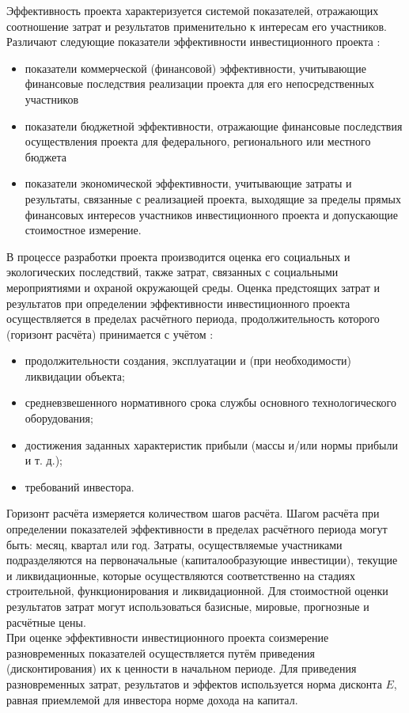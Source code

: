 \documentclass[a4paper,12pt]{article}
\begin{document}
Эффективность проекта характеризуется системой показателей, отражающих соотношение затрат и результатов применительно к интересам
его участников.
Различают следующие показатели эффективности инвестиционного
проекта :
\begin{itemize}
\item показатели коммерческой (финансовой) эффективности, учитывающие финансовые последствия реализации проекта для его непосредственных участников
\item показатели бюджетной эффективности, отражающие финансовые последствия осуществления проекта для федерального, регионального или местного бюджета
\item показатели экономической эффективности, учитывающие затраты и
результаты, связанные с реализацией проекта, выходящие за пределы
прямых финансовых интересов участников инвестиционного проекта и
допускающие стоимостное измерение.\\
\end{itemize}
В процессе разработки проекта производится оценка его социальных
и экологических последствий, также затрат, связанных с социальными мероприятиями и охраной окружающей среды.
Оценка предстоящих затрат и результатов при определении эффективности инвестиционного проекта осуществляется в пределах расчётного периода, продолжительность которого (горизонт расчёта) принимается с учётом :
\begin{itemize}
	\item продолжительности создания, эксплуатации и (при необходимости) ликвидации объекта;
	\item средневзвешенного нормативного срока службы основного технологического оборудования;
	\item достижения заданных характеристик прибыли (массы и/или нормы прибыли и т. д.);
\item требований инвестора. \\
\end{itemize}
Горизонт расчёта измеряется количеством шагов расчёта. Шагом расчёта при определении показателей эффективности в пределах расчётного периода могут быть: месяц, квартал или год.
Затраты, осуществляемые участниками подразделяются на первоначальные (капиталообразующие инвестиции), текущие и ликвидационные,
которые осуществляются соответственно на стадиях строительной, функционирования и ликвидационной. Для стоимостной оценки результатов затрат могут использоваться базисные, мировые, прогнозные и расчётные цены.\\
При оценке эффективности инвестиционного проекта соизмерение
разновременных показателей осуществляется путём приведения (дисконтирования) их к ценности в начальном периоде. Для приведения разновременных затрат, результатов и эффектов используется норма дисконта ${E}$, равная приемлемой для инвестора норме дохода на капитал.\\ 
\end{document}
